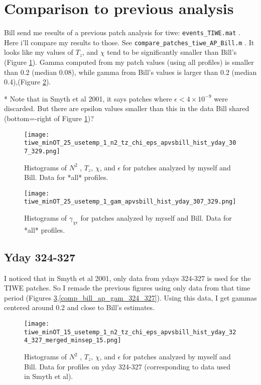 \documentclass[11pt]{article}
\begin{document}
\clearpage
\section{Comparison to previous analysis}

Bill send me results of a previous patch analysis for tiwe: \verb+events_TIWE.mat+ . Here i'll compare my results to those. See \verb+compare_patches_tiwe_AP_Bill.m+ . It looks like my values of $T_z$, and $\chi$ tend to be significantly smaller than Bill's (Figure \ref{comp_bill_ap_1}). Gamma computed from my patch values (using all profiles) is smaller than 0.2 (median 0.08), while gamma from Bill's values is larger than 0.2 (median 0.4),(Figure \ref{comp_bill_ap_gam}).

* Note that in Smyth et al 2001, it says patches where $\epsilon < 4 \times 10^{-9}$ were discarded. But there are epsilon values smaller than this in the data Bill shared (bottom=-right of Figure \ref{comp_bill_ap_1})?

\begin{figure}[htbp]
\texttt{[image: tiwe\_minOT\_25\_usetemp\_1\_n2\_tz\_chi\_eps\_apvsbill\_hist\_yday\_307\_329.png]}
\caption{Histograms of $N^2$ , $T_z$, $\chi$, and $\epsilon$ for patches analyzed by myself and Bill. Data for *all* profiles.}
\label{comp_bill_ap_1}
\end{figure}
%

\begin{figure}[htbp]
\texttt{[image: tiwe\_minOT\_25\_usetemp\_1\_gam\_apvsbill\_hist\_yday\_307\_329.png]}
\caption{Histograms of $\gamma_{\chi\epsilon}$ for patches analyzed by myself and Bill. Data for *all* profiles.}
\label{comp_bill_ap_gam}
\end{figure}



\clearpage
\subsection{Yday 324-327}

I noticed that in Smyth et al 2001, only data from ydays 324-327 is used for the TIWE patches. So I remade the previous figures using only data from that time period (Figures \ref{comp_bill_ap_324_327},\ref{comp_bill_ap_gam_324_327}). Using this data, I get  gammas centered around 0.2 and close to Bill's estimates. 

\begin{figure}[htbp]
\texttt{[image: tiwe\_minOT\_15\_usetemp\_1\_n2\_tz\_chi\_eps\_apvsbill\_hist\_yday\_324\_327\_merged\_minsep\_15.png]}
\caption{Histograms of $N^2$ , $T_z$, $\chi$, and $\epsilon$ for patches analyzed by myself and Bill. Data for profiles on yday 324-327 (corresponding to data used in Smyth et al).}
\label{comp_bill_ap_324_327}
\end{figure}
\end{document}
